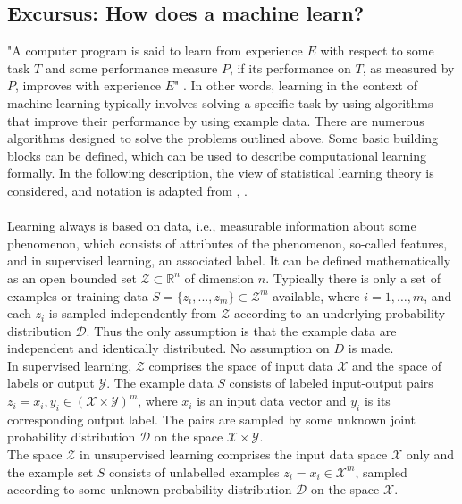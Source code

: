 \begin{tcolorbox}
    \subsection*{Excursus: How does a machine learn?}
    "A computer program is said to learn from experience $E$ with respect to some task $T$ and some performance measure $P$, if its performance on $T$, as measured by $P$, improves with experience $E$" \cite{Mitchell1997}. In other words, learning in the context of machine learning typically involves solving a specific task by using algorithms that improve their performance by using example data. There are numerous algorithms designed to solve the problems outlined above. Some basic building blocks can be defined, which can be used to describe computational learning formally. In the following description, the view of statistical learning theory is considered, and notation is adapted from \citeauthor{Shalev2014} \cite{Shalev2014}, \citeauthor{Von_luxburg2011} \cite{Von_luxburg2011}.\\
    \\
    Learning always is based on data, i.e., measurable information about some phenomenon, which consists of attributes of the phenomenon, so-called features, and in supervised learning, an associated label. It can be defined mathematically as an open bounded set $\mathcal{Z}\subset\mathbb{R}^n$ of dimension $n$. Typically there is only a set of examples or training data $S=\{z_i,...,z_m\}\subset{\mathcal{Z}}^m$ available, where $i = 1,\dots,m$, and each $z_i$ is sampled independently from $\mathcal{Z}$ according to an underlying probability distribution $\mathcal{D}$. Thus the only assumption is that the example data are independent and identically distributed. No assumption on $D$ is made.\\
    In supervised learning, $\mathcal{Z}$ comprises the space of input data $\mathcal{X}$ and the space of labels or output $\mathcal{Y}$. The example data $S$ consists of labeled input-output pairs $z_i=x_i,y_i\in(\mathcal{X}\times\mathcal{Y})^m$, where $x_i$ is an input data vector and $y_i$ is its corresponding output label. The pairs are sampled by some unknown joint probability distribution $\mathcal{D}$ on the space $\mathcal{X}\times\mathcal{Y}$.\\
    The space $\mathcal{Z}$ in unsupervised learning comprises the input data space $\mathcal{X}$ only and the example set $S$ consists of unlabelled examples $z_i=x_i\in\mathcal{X}^m$, sampled according to some unknown probability distribution $\mathcal{D}$ on the space $\mathcal{X}$.\\

\end{tcolorbox}
